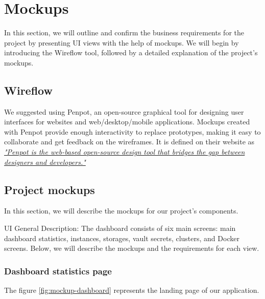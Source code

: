 \section{Mockups}
In this section, we will outline and confirm the business requirements for the project by presenting UI views 
with the help of mockups. We will begin by introducing the Wireflow tool,
followed by a detailed explanation of the project's mockups.



\subsection{Wireflow}
We suggested using Penpot, an open-source graphical tool for designing user interfaces for websites and
web/desktop/mobile applications. Mockups created with Penpot provide enough interactivity to replace prototypes,
making it easy to collaborate and get feedback on the wireframes. It is defined on their website as \href{https://penpot.app/}{\textit{"Penpot is the web-based open-source design tool that bridges the gap between designers and developers."}}


\subsection{Project mockups}
In this section, we will describe the mockups for our project’s components.

UI General Description:
The dashboard consists of six main screens: main dashboard statistics, instances, storages, vault secrets, clusters, and Docker screens. Below, we will describe the mockups and the requirements for each view.

\subsubsection{Dashboard statistics page}

The figure \hyperref[fig:mockup-dashboard]{\ref{fig:mockup-dashboard}} represents the landing page of our application.

